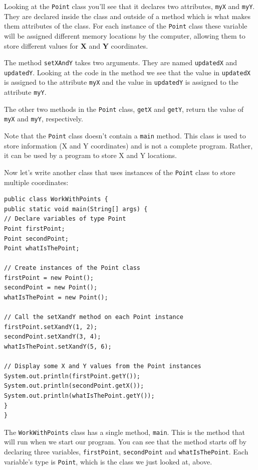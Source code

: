 Looking at the \texttt{Point} class you'll see that it declares two attributes, \texttt{myX} and \texttt{myY}. They are declared inside the class and outside of a method which is what makes them attributes of the class. For each instance of the \texttt{Point} class these variable will be assigned different memory locations by the computer, allowing them to store different values for \textbf{X} and \textbf{Y} coordinates.

The method \texttt{setXAndY} takes two arguments. They are named \texttt{updatedX} and \texttt{updatedY}. Looking at the code in the method we see that the value in \texttt{updatedX} is assigned to the attribute \texttt{myX} and the value in \texttt{updatedY} is assigned to the attribute \texttt{myY}. 

The other two methods in the \texttt{Point} class, \texttt{getX} and \texttt{getY}, return the value of \texttt{myX} and \texttt{myY}, respectively.

Note that the \texttt{Point} class doesn't contain a \texttt{main} method. This class is used to store information (X and Y coordinates) and is not a complete program. Rather, it can be used by a program to store X and Y locations.

\newpage

Now let's write another class that uses instances of the \texttt{Point} class to store multiple coordinates:

\beforeverb
\begin{verbatim}
public class WorkWithPoints {
public static void main(String[] args) {
// Declare variables of type Point
Point firstPoint;
Point secondPoint;
Point whatIsThePoint;

// Create instances of the Point class
firstPoint = new Point();
secondPoint = new Point();
whatIsThePoint = new Point();

// Call the setXandY method on each Point instance
firstPoint.setXandY(1, 2);
secondPoint.setXandY(3, 4);
whatIsThePoint.setXandY(5, 6);

// Display some X and Y values from the Point instances
System.out.println(firstPoint.getY());
System.out.println(secondPoint.getX());
System.out.println(whatIsThePoint.getY());
}
}
\end{verbatim}
\afterverb

The \texttt{WorkWithPoints} class has a single method, \texttt{main}. This is the method that will run when we start our program. You can see that the method starts off by declaring three variables, \texttt{firstPoint}, \texttt{secondPoint} and \texttt{whatIsThePoint}. Each variable's type is \texttt{Point}, which is the class we just looked at, above. 

